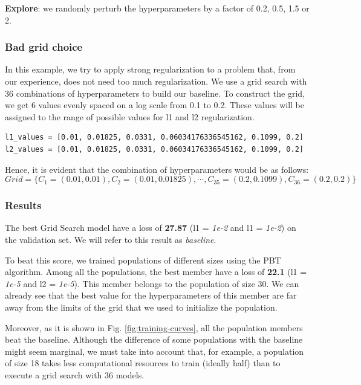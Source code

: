 \documentclass{article}
\begin{document}
\textbf{Explore}: we randomly perturb the hyperparameters by a factor of 0.2, 0.5, 1.5 or 2.

\subsubsection{Bad grid choice}

In this example, we try to apply strong regularization to a problem that, from our experience, does not need too much regularization. We use a grid search with 36 combinations of hyperparameters to build our baseline. To construct the grid, we get 6 values evenly spaced on a log scale from 0.1 to 0.2. These values will be assigned to the range of possible values for l1 and l2 regularization.

\begin{verbatim}
l1_values = [0.01, 0.01825, 0.0331, 0.06034176336545162, 0.1099, 0.2]
l2_values = [0.01, 0.01825, 0.0331, 0.06034176336545162, 0.1099, 0.2]
\end{verbatim}

Hence, it is evident that the combination of hyperparameters would be as follows:
$$
Grid = \{C_1 = (0.01, 0.01), C_2 = (0.01, 0.01825), \cdots, C_{35} = (0.2, 0.1099), C_{36} = (0.2, 0.2)\}
$$

\subsubsection*{Results}

The best Grid Search model have a loss of \textbf{27.87} (l1 = \textit{1e-2} and l1 = \textit{1e-2}) on the validation set. We will refer to this result as \textit{baseline}.

To beat this score, we trained populations of different sizes using the PBT algorithm. Among all the populations, the best member have a loss of \textbf{22.1} (l1 = \textit{1e-5} and l2 = \textit{1e-5}). This member belongs to the population of size 30. We can already see that the best value for the hyperparameters of this member are far away from the limits of the grid that we used to initialize the population.

Moreover, as it is shown in Fig. \ref{fig:training-curves}, all the population members beat the baseline. Although the difference of some populations with the baseline might seem marginal, we must take into account that, for example, a population of size 18 takes less computational resources to train (ideally half) than to execute a grid search with 36 models.
\end{document}

